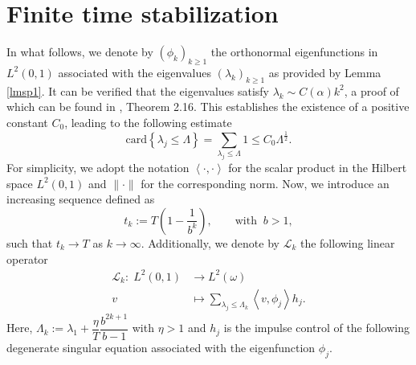 \documentclass[sn-mathphys]{sn-jnl}
\begin{document}
\section{Finite time stabilization}\label{sec4}
In what follows, we denote by $(\phi_k)_{k \geq 1}$ the orthonormal eigenfunctions in $L^2(0,1)$ associated with the eigenvalues $(\lambda_k)_{k\geq1}$ as provided by Lemma \ref{lmsp1}. It can be verified that the eigenvalues satisfy $\lambda_k \sim C(\alpha) k^2$, a proof of which can be found in \cite{Gal2015}, Theorem 2.16. This establishes the existence of a positive constant $C_0$, leading to the following estimate
\begin{equation}\label{equa34}
   \mathrm{card}\left\lbrace \lambda_{j}\leq \Lambda\right\rbrace=\sum_{\lambda_{j}\leq \Lambda} 1\leq C_0 \Lambda^{\frac{1}{2}}.  
\end{equation}
For simplicity, we adopt the notation $\left\langle \cdot , \cdot \right\rangle$ for the scalar product in the Hilbert space $L^2(0,1)$ and $\|\cdot\|$ for the corresponding norm.  Now, we introduce an increasing sequence defined as
\begin{equation}\label{equ34}
    t_{k} :=T\left( 1-\dfrac{1}{b^k} \right), \qquad \text{with}\;\; b>1,
\end{equation}
such that $t_k \rightarrow T$ as $k \rightarrow \infty$. Additionally, we denote by $\mathcal{L}_{k}$ the following linear operator
\begin{align}\label{eq35}
    \mathcal{L}_{k}:\;  L^2(0,1) &\rightarrow L^2(\omega) \nonumber\\
                    v \quad&\mapsto \sum _{\lambda_{j}\leq \Lambda_{k}}\left\langle v, \phi_{j} \right\rangle  h_{j}.
\end{align}
Here, $\Lambda_{k}:=\lambda_{1}+\dfrac{\eta}{T}\dfrac{b^{2k+1}}{b-1}$ with $\eta>1$ and $h_{j}$ is the impulse control of the following degenerate singular equation associated with the eigenfunction $\phi_{j}$.
\end{document}
